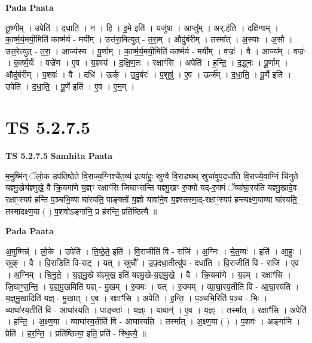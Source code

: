 \documentclass[17pt]{extarticle}
\begin{document}
\textbf{Pada Paata} \newline

तू॒ष्णीम् । उपेति॑ । द॒धा॒ति॒ । न । हि । इ॒मे इति॑ । यजु॑षा । आप्तु᳚म् । अर्.ह॑ति । दक्षि॑णाम् । का॒र्ष्म॒र्य॒मयी॒मिति॑ कार्ष्मर्य - मयी᳚म् । उत्त॑रा॒मित्युत् - त॒रा॒म् । औदु॑बंरीम् । तस्मा᳚त् । अ॒स्याः । अ॒सौ । उत्त॒रेत्युत् - त॒रा॒ । आज्य॑स्य । पू॒र्णाम् । का॒र्ष्म॒र्य॒मयी॒मिति॑ कार्ष्मर्य - मयी᳚म् । वज्रः॑ । वै । आज्य᳚म् । वज्रः॑ । का॒र्ष्म॒र्यः॑ । वज्रे॑ण । ए॒व । य॒ज्ञ्स्य॑ । द॒क्षि॒ण॒तः । रक्षाꣳ॑सि । अपेति॑ । ह॒न्ति॒ । द॒द्ध्नः । पू॒र्णाम् । औदु॑बंरीम् । प॒शवः॑ । वै । दधि॑ । ऊर्क् । उ॒दु॒बंरः॑ । प॒शुषु॑ । ए॒व । ऊर्ज᳚म् । द॒धा॒ति॒ । पू॒र्णे इति॑ । उपेति॑ । द॒धा॒ति॒ । पू॒र्णे इति॑ । ए॒व । ए॒न॒म् ।  \newline




\section*{ TS 5.2.7.5 }

\textbf{TS 5.2.7.5 } \newline
\textbf{Samhita Paata} \newline

म॒मुष्मि॑न् ॅलो॒क उप॑तिष्ठेते वि॒राज्य॒ग्निश्चे॑त॒व्य॑ इत्या॑हुः॒ स्रुग्वै वि॒राड्यथ् स्रुचा॑वुप॒दधा॑ति वि॒राज्ये॒वाग्निं चि॑नुते यज्ञ्मु॒खेय॑ज्ञ्मुखे॒ वै क्रि॒यमा॑णे य॒ज्ञ्ꣳ रक्षाꣳ॑सि जिघाꣳसन्ति यज्ञ्मु॒खꣳ रु॒क्मो यद्-रु॒क्मं ॅव्या॑घा॒रय॑ति यज्ञ्मु॒खादे॒व रक्षाꣳ॒॒स्यप॑ हन्ति प॒ञ्चभि॒व्या घा॑रयति॒ पाङ्क्तो॑ य॒ज्ञो यावा॑ने॒व य॒ज्ञ्स्तस्मा॒द्-रक्षाꣳ॒॒स्यप॑ हन्त्यक्ष्ण॒याव्या घा॑रयति॒ तस्मा॑दक्ष्ण॒या ( ) प॒शवोऽङ्गा॑नि॒ प्र ह॑रन्ति॒ प्रति॑ष्ठित्यै ॥ \newline

\textbf{Pada Paata} \newline

अ॒मुष्मिन्न्॑ । लो॒के । उपेति॑ । ति॒ष्ठे॒ते॒ इति॑ । वि॒राजीति॑ वि - राजि॑ । अ॒ग्निः । चे॒त॒व्यः॑ । इति॑ । आ॒हुः॒ । स्रुक् । वै । वि॒राडिति॑ वि-राट् । यत् । स्रुचौ᳚ । उ॒प॒दधा॒तीत्यु॑प - दधा॑ति । वि॒राजीति॑ वि - राजि॑ । ए॒व । अ॒ग्निम् । चि॒नु॒ते॒ । य॒ज्ञ्॒मु॒खे य॑ज्ञ्मुख॒ इति॑ यज्ञ्मु॒खे-य॒ज्ञ्॒मु॒खे॒ । वै । क्रि॒यमा॑णे । य॒ज्ञ्म् । रक्षाꣳ॑सि । जि॒घाꣳ॒॒स॒न्ति॒ । य॒ज्ञ्॒मु॒खमिति॑ यज्ञ् - मु॒खम् । रु॒क्मः । यत् । रु॒क्मम् । व्या॒घा॒रय॒तीति॑ वि - आ॒घा॒रय॑ति । य॒ज्ञ्॒मु॒खादिति॑ यज्ञ् - मु॒खात् । ए॒व । रक्षाꣳ॑सि । अपेति॑ । ह॒न्ति॒ । प॒ञ्चभि॒रिति॑ प॒ञ्च - भिः॒ । व्याघा॑रय॒तीति॑ वि - आघा॑रयति । पाङ्क्तः॑ । य॒ज्ञ्ः । यावान्॑ । ए॒व । य॒ज्ञ्ः । तस्मा᳚त् । रक्षाꣳ॑सि । अपेति॑ । ह॒न्ति॒ । अ॒क्ष्ण॒या । व्याघा॑रय॒तीति॑ वि - आघा॑रयति । तस्मा᳚त् । अ॒क्ष्ण॒या ( ) । प॒शवः॑ । अङ्गा॑नि । प्रेति॑ । ह॒र॒न्ति॒ । प्रति॑ष्ठित्या॒ इति॒ प्रति॑ - स्थि॒त्यै॒ ॥  \newline
\end{document}
